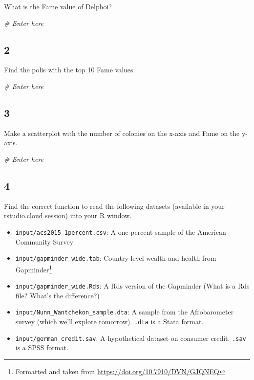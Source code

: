 \documentclass[]{book}
\newenvironment{Shaded}{\begin{snugshade}}{\end{snugshade}}
\newcommand{\CommentTok}[1]{\textcolor[rgb]{0.56,0.35,0.01}{\textit{#1}}}
\providecommand{\tightlist}{%
  \setlength{\itemsep}{0pt}\setlength{\parskip}{0pt}}
\let\rmarkdownfootnote\footnote%
\def\footnote{\protect\rmarkdownfootnote}
\theoremstyle{definition}
\theoremstyle{definition}
\theoremstyle{definition}
\theoremstyle{remark}
\begin{document}
What is the Fame value of Delphoi?

\begin{Shaded}
\begin{Highlighting}[]
\CommentTok{# Enter here}
\end{Highlighting}
\end{Shaded}

\hypertarget{section-1}{%
\subsection*{2}\label{section-1}}

Find the polis with the top 10 Fame values.

\begin{Shaded}
\begin{Highlighting}[]
\CommentTok{# Enter here}
\end{Highlighting}
\end{Shaded}

\hypertarget{section-2}{%
\subsection*{3}\label{section-2}}

Make a scatterplot with the number of colonies on the x-axis and Fame on the y-axis.

\begin{Shaded}
\begin{Highlighting}[]
\CommentTok{# Enter here}
\end{Highlighting}
\end{Shaded}

\hypertarget{section-3}{%
\subsection*{4}\label{section-3}}

Find the correct function to read the following datasets (available in your rstudio.cloud session) into your R window.

\begin{itemize}
\tightlist
\item
  \texttt{input/acs2015\_1percent.csv}: A one percent sample of the American Community Survey
\item
  \texttt{input/gapminder\_wide.tab}: Country-level wealth and health from Gapminder\footnote{Formatted and taken from \url{https://doi.org/10.7910/DVN/GJQNEQ}}
\item
  \texttt{input/gapminder\_wide.Rds}: A Rds version of the Gapminder (What is a Rds file? What's the difference?)
\item
  \texttt{input/Nunn\_Wantchekon\_sample.dta}: A sample from the Afrobarometer survey (which we'll explore tomorrow). \texttt{.dta} is a Stata format.
\item
  \texttt{input/german\_credit.sav}: A hypothetical dataset on consumer credit. \texttt{.sav} is a SPSS format.
\end{itemize}
\end{document}
